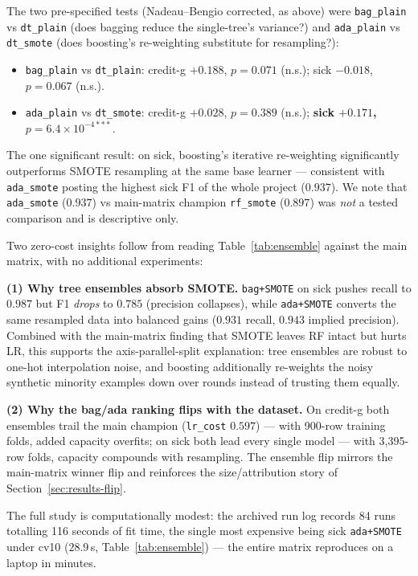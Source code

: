 The two pre-specified tests (Nadeau--Bengio corrected, as above) were \texttt{bag\_plain} vs \texttt{dt\_plain} (does bagging reduce the single-tree's variance?) and \texttt{ada\_plain} vs \texttt{dt\_smote} (does boosting's re-weighting substitute for resampling?):

\begin{itemize}
  \item \texttt{bag\_plain} vs \texttt{dt\_plain}: credit-g $+0.188$, $p=0.071$ (n.s.); sick $-0.018$, $p=0.067$ (n.s.).
  \item \texttt{ada\_plain} vs \texttt{dt\_smote}: credit-g $+0.028$, $p=0.389$ (n.s.); \textbf{sick $+0.171$, $p=6.4\times10^{-4***}$}.
\end{itemize}

The one significant result: on sick, boosting's iterative re-weighting significantly outperforms SMOTE resampling at the same base learner --- consistent with \texttt{ada\_smote} posting the highest sick F1 of the whole project ($0.937$). We note that \texttt{ada\_smote} ($0.937$) vs main-matrix champion \texttt{rf\_smote} ($0.897$) was \emph{not} a tested comparison and is descriptive only.

Two zero-cost insights follow from reading Table~\ref{tab:ensemble} against the main matrix, with no additional experiments:

\textbf{(1) Why tree ensembles absorb SMOTE.} \texttt{bag+SMOTE} on sick pushes recall to $0.987$ but F1 \emph{drops} to $0.785$ (precision collapses), while \texttt{ada+SMOTE} converts the same resampled data into balanced gains ($0.931$ recall, $0.943$ implied precision). Combined with the main-matrix finding that SMOTE leaves RF intact but hurts LR, this supports the axis-parallel-split explanation: tree ensembles are robust to one-hot interpolation noise, and boosting additionally re-weights the noisy synthetic minority examples down over rounds instead of trusting them equally.

\textbf{(2) Why the bag/ada ranking flips with the dataset.} On credit-g both ensembles trail the main champion (\texttt{lr\_cost} $0.597$) --- with 900-row training folds, added capacity overfits; on sick both lead every single model --- with 3{,}395-row folds, capacity compounds with resampling. The ensemble flip mirrors the main-matrix winner flip and reinforces the size/attribution story of Section~\ref{sec:results-flip}.

The full study is computationally modest: the archived run log records 84 runs totalling 116 seconds of fit time, the single most expensive being sick \texttt{ada+SMOTE} under cv10 ($28.9$\,s, Table~\ref{tab:ensemble}) --- the entire matrix reproduces on a laptop in minutes.

